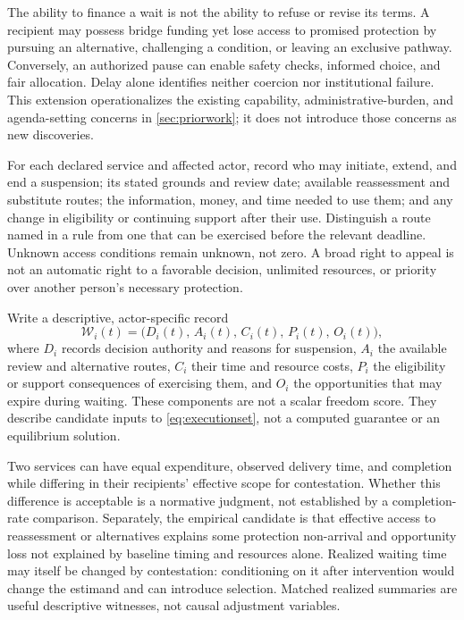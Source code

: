 \documentclass[11pt,a4paper]{article}
\numberwithin{equation}{section}
\theoremstyle{definition}
\theoremstyle{plain}
\theoremstyle{remark}
\begin{document}
The ability to finance a wait is not the ability to refuse or revise its terms. A recipient may possess bridge funding yet lose access to promised protection by pursuing an alternative, challenging a condition, or leaving an exclusive pathway. Conversely, an authorized pause can enable safety checks, informed choice, and fair allocation. Delay alone identifies neither coercion nor institutional failure. This extension operationalizes the existing capability, administrative-burden, and agenda-setting concerns in \cref{sec:priorwork}; it does not introduce those concerns as new discoveries.

For each declared service and affected actor, record who may initiate, extend, and end a suspension; its stated grounds and review date; available reassessment and substitute routes; the information, money, and time needed to use them; and any change in eligibility or continuing support after their use. Distinguish a route named in a rule from one that can be exercised before the relevant deadline. Unknown access conditions remain unknown, not zero. A broad right to appeal is not an automatic right to a favorable decision, unlimited resources, or priority over another person's necessary protection.

Write a descriptive, actor-specific record
\begin{equation}
\mathcal W_i(t)=
\bigl(D_i(t),\,A_i(t),\,C_i(t),\,P_i(t),\,O_i(t)\bigr),
\label{eq:waitingrecord}
\end{equation}
where $D_i$ records decision authority and reasons for suspension, $A_i$ the available review and alternative routes, $C_i$ their time and resource costs, $P_i$ the eligibility or support consequences of exercising them, and $O_i$ the opportunities that may expire during waiting. These components are not a scalar freedom score. They describe candidate inputs to \cref{eq:executionset}, not a computed guarantee or an equilibrium solution.

Two services can have equal expenditure, observed delivery time, and completion while differing in their recipients' effective scope for contestation. Whether this difference is acceptable is a normative judgment, not established by a completion-rate comparison. Separately, the empirical candidate is that effective access to reassessment or alternatives explains some protection non-arrival and opportunity loss not explained by baseline timing and resources alone. Realized waiting time may itself be changed by contestation: conditioning on it after intervention would change the estimand and can introduce selection. Matched realized summaries are useful descriptive witnesses, not causal adjustment variables.
\end{document}

